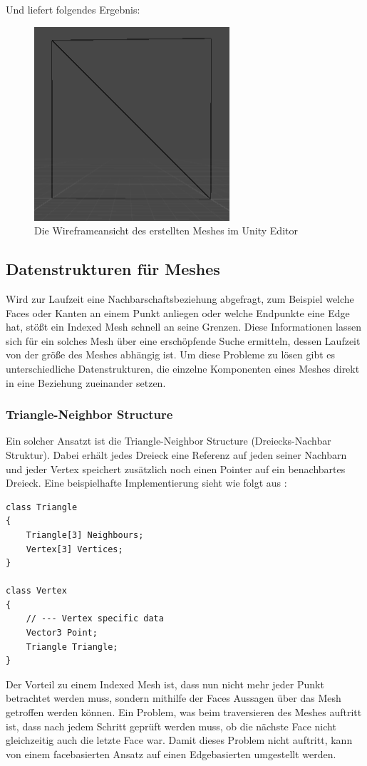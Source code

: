 Und liefert folgendes Ergebnis:
\begin{figure}[h]
	\centering
	\includegraphics[width=0.35\linewidth]{Images/UnityQuadWireframe}
	\caption[Die Wireframeansicht des erstellten Meshes]{Die Wireframeansicht des erstellten Meshes im Unity Editor}
	\label{fig:unityquadwireframe}
\end{figure}

\subsection{Datenstrukturen f\"ur Meshes}
Wird zur Laufzeit eine Nachbarschaftsbeziehung abgefragt, zum Beispiel welche Faces oder Kanten an einem Punkt anliegen oder welche Endpunkte eine Edge hat, st\"o{\ss}t ein Indexed Mesh schnell an seine Grenzen. Diese Informationen lassen sich f\"ur ein solches Mesh \"uber eine ersch\"opfende Suche ermitteln, dessen Laufzeit von der gr\"o{\ss}e des Meshes abh\"angig ist. Um diese Probleme zu l\"osen gibt es unterschiedliche Datenstrukturen, die einzelne Komponenten eines Meshes direkt in eine Beziehung zueinander setzen.

\subsubsection{Triangle-Neighbor Structure}
Ein solcher Ansatzt ist die Triangle-Neighbor Structure (Dreiecks-Nachbar Struktur). Dabei erh\"alt jedes Dreieck eine Referenz auf jeden seiner Nachbarn und jeder Vertex speichert zus\"atzlich noch einen Pointer auf ein benachbartes Dreieck. Eine beispielhafte Implementierung sieht wie folgt aus \cite[S.269]{Shirley2010}:
\begin{lstlisting}
class Triangle 
{
	Triangle[3] Neighbours;
	Vertex[3] Vertices; 
}

class Vertex 
{
	// --- Vertex specific data
	Vector3 Point;
	Triangle Triangle;
}
\end{lstlisting}

Der Vorteil zu einem Indexed Mesh ist, dass nun nicht mehr jeder Punkt betrachtet werden muss, sondern mithilfe der Faces Aussagen \"uber das Mesh getroffen werden k\"onnen. Ein Problem, was beim traversieren des Meshes auftritt ist, dass nach jedem Schritt gepr\"uft werden muss, ob die n\"achste Face nicht gleichzeitig auch die letzte Face war. Damit dieses Problem nicht auftritt, kann von einem facebasierten Ansatz auf einen Edgebasierten umgestellt werden.

